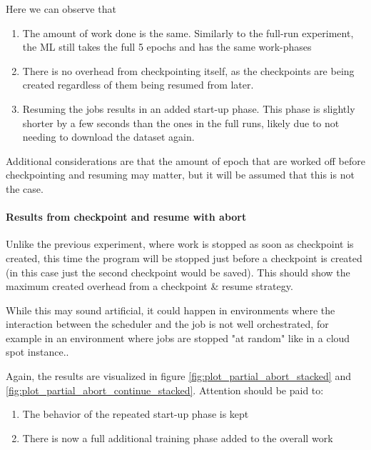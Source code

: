 Here we can observe that

\begin{enumerate}
    \item The amount of work done is the same. 
    Similarly to the full-run experiment, the ML still takes the full 5 epochs and has the same work-phases
    \item There is no overhead from checkpointing itself, as the checkpoints are being created regardless of them being resumed from later.
    \item Resuming the jobs results in an added start-up phase. This phase is slightly shorter by a few seconds than the ones in the full runs, likely due to not needing to download the dataset again.
\end{enumerate}

Additional considerations are that the amount of epoch that are worked off before checkpointing and resuming may matter, but it will be assumed that this is not the case.

\paragraph{Results from checkpoint and resume with abort}

Unlike the previous experiment, where work is stopped as soon as checkpoint is created, this time the program will be stopped just before a checkpoint is created (in this case just the second checkpoint would be saved). 
This should show the maximum created overhead from a checkpoint \& resume strategy. 

While this may sound artificial, it could happen in environments where the interaction between the scheduler and the job is not well orchestrated, for example in an environment where jobs are stopped "at random" like in a cloud spot instance..

Again, the results are visualized in figure \ref{fig:plot_partial_abort_stacked} and \ref{fig:plot_partial_abort_continue_stacked}. Attention should be paid to:

\begin{enumerate}
    \item The behavior of the repeated start-up phase is kept
    \item There is now a full additional training phase added to the overall work
\end{enumerate}

